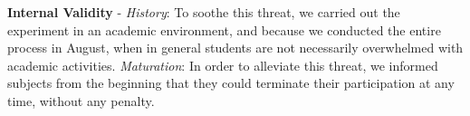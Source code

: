 \documentclass[a4paper,twoside,anonymous]{article}
\begin{document}
\textbf{Internal Validity} - 
\textit{History}:
To soothe this threat, we carried out the experiment in an academic environment, and because we conducted the entire process in August, when in general students are not necessarily overwhelmed with academic activities.
\textit{Maturation}:
In order to alleviate this threat, we informed subjects from the beginning that they could terminate their participation at any time, without any penalty.
\end{document}
